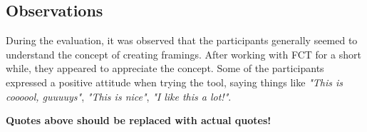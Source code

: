 \subsection{Observations}
During the evaluation, it was observed that the participants generally seemed to understand the concept of creating framings. After working with FCT for a short while, they appeared to appreciate the concept. Some of the participants expressed a positive attitude when trying the tool, saying things like \textit{"This is coooool, guuuuys"}, \textit{"This is nice"}, \textit{"I like this a lot!"}.

\textbf{Quotes above should be replaced with actual quotes!}